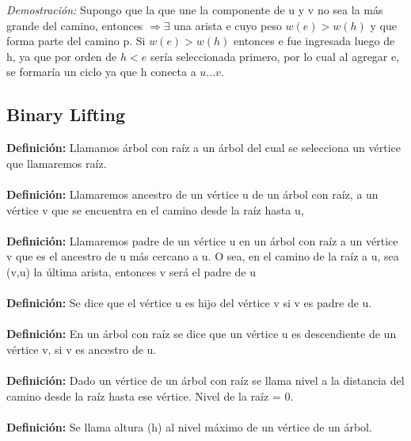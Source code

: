 \documentclass[12pt]{article}
\begin{document}
\textit{Demostraci\'on:} Supongo que la que une la componente de u y v no sea la m\'as grande del camino, entonces $\Rightarrow \exists$ una arista e cuyo
peso $w(e) > w (h)$ y que forma parte  del camino p. Si $ w(e) > w(h)$  entonces e fue ingresada luego de h, ya que por orden de $h < e$ ser\'ia seleccionada primero, 
por lo cual al agregar e, se formar\'ia un ciclo ya que h conecta a $u... v$. \\






\subsection{\textbf{Binary Lifting}}


\textbf{Definici\'on:} Llamamos \'arbol con ra\'iz a un \'arbol del cual se selecciona un v\'ertice que llamaremos ra\'iz.\\
\\


\textbf{Definici\'on:} Llamaremos ancestro de un v\'ertice u de un \'arbol con ra\'iz, a un v\'ertice v que se encuentra en el camino desde la ra\'iz hasta u,\\
\\



\textbf{Definici\'on:} Llamaremos padre de un v\'ertice u en un \'arbol con ra\'iz a un v\'ertice v que es el ancestro de u m\'as cercano a u. O sea, en el camino de la ra\'iz a u, sea (v,u) la \'ultima arista, entonces v ser\'a el padre de u\\
\\


\textbf{Definici\'on:} Se dice que el v\'ertice u es hijo del v\'ertice v si v es padre de u.\\
\\


\textbf{Definici\'on:} En un \'arbol con ra\'iz se dice que un v\'ertice u es descendiente de un v\'ertice v, si v es ancestro de u.\\
\\


\textbf{Definici\'on:} Dado un v\'ertice de un \'arbol con ra\'iz se llama nivel a la distancia del  camino desde la ra\'iz hasta ese v\'ertice. Nivel de la ra\'iz = 0.\\
\\


\textbf{Definici\'on:} Se llama altura (h) al nivel m\'aximo de un v\'ertice de un \'arbol.\\
\\
\end{document}
